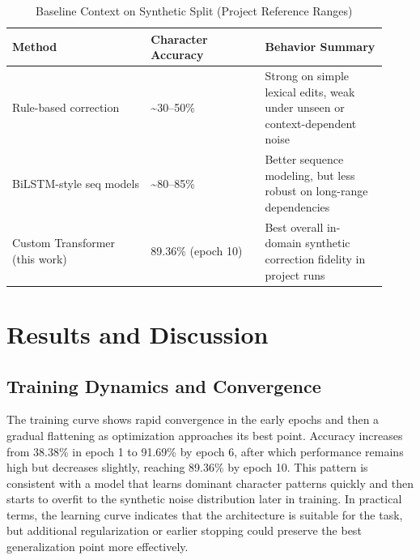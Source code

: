 \documentclass[conference]{IEEEtran}
\begin{document}
\begin{table}[!t]
\caption{Baseline Context on Synthetic Split (Project Reference Ranges)}
\label{tab:baseline_context}
\centering
\setlength{\tabcolsep}{3pt}
\footnotesize
\begin{tabular}{p{0.34\linewidth}p{0.28\linewidth}p{0.30\linewidth}}
\toprule
\textbf{Method} & \textbf{Character Accuracy} & \textbf{Behavior Summary} \\
\midrule
Rule-based correction & \textasciitilde{}30--50\% & Strong on simple lexical edits, weak under unseen or context-dependent noise \\
BiLSTM-style seq models & \textasciitilde{}80--85\% & Better sequence modeling, but less robust on long-range dependencies \\
Custom Transformer (this work) & 89.36\% (epoch 10) & Best overall in-domain synthetic correction fidelity in project runs \\
\bottomrule
\end{tabular}
\end{table}

\section{Results and Discussion}
\subsection{Training Dynamics and Convergence}
The training curve shows rapid convergence in the early epochs and then a gradual flattening as optimization approaches its best point. Accuracy increases from 38.38\% in epoch 1 to 91.69\% by epoch 6, after which performance remains high but decreases slightly, reaching 89.36\% by epoch 10. This pattern is consistent with a model that learns dominant character patterns quickly and then starts to overfit to the synthetic noise distribution later in training. In practical terms, the learning curve indicates that the architecture is suitable for the task, but additional regularization or earlier stopping could preserve the best generalization point more effectively.
\end{document}
